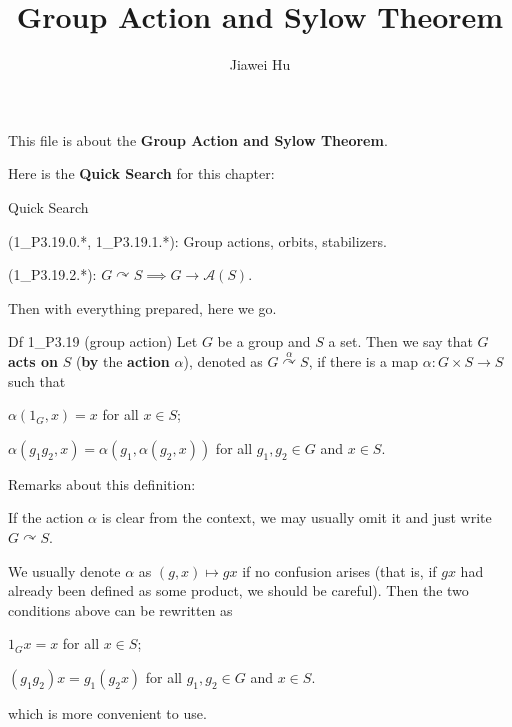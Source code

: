 \documentclass{article}
\title{\LARGE \textbf{Group Action and Sylow Theorem}}
\author{\large Jiawei Hu}
\newcommand{\act}{\curvearrowright}
\begin{document}
\maketitle

This file is about the \textbf{Group Action and Sylow Theorem}. 

Here is the \textbf{Quick Search} for this chapter:
\begin{Th}{Quick Search}
    \begin{compactdesc}
        \item (1\_P3.19.0.*, 1\_P3.19.1.*): Group actions, orbits, stabilizers.
        \item (1\_P3.19.2.*): $G\act S \implies G\to \mathcal{A}(S)$.
    \end{compactdesc}
\end{Th}

Then with everything prepared, here we go. 

\begin{Df}{Df 1\_P3.19 (group action)}
    Let $G$ be a group and $S$ a set. Then we say that $G$ \textbf{acts on} $S$ (\textbf{by} the \textbf{action} $\alpha$), denoted as $G\overset{\alpha}{\act} S$, if there is a map $\alpha: G \times S \to S$ such that
    \begin{compactenum}
        \item $\alpha(1_G, x) = x$ for all $x \in S$;
        \item $\alpha(g_1g_2, x) = \alpha(g_1, \alpha(g_2, x))$ for all $g_1, g_2 \in G$ and $x \in S$.
    \end{compactenum}
\end{Df}

\begin{Rmk}{}
    Remarks about this definition:
    \begin{compactenum}
        \item \textcolor{Df}{If the action $\alpha$ is clear from the context, we may usually omit it and just write $G \curvearrowright S$.}
        \item \textcolor{Df}{We usually denote $\alpha$ as $(g, x)\mapsto gx$ if no confusion arises (that is, if $gx$ had already been defined as some product, we should be careful).} Then the two conditions above can be rewritten as
        \begin{compactenum}
            \item $1_G x = x$ for all $x \in S$;
            \item $(g_1g_2)x = g_1(g_2x)$ for all $g_1, g_2 \in G$ and $x \in S$.
        \end{compactenum}
        which is more convenient to use.
    \end{compactenum}
\end{Rmk}
\end{document}
